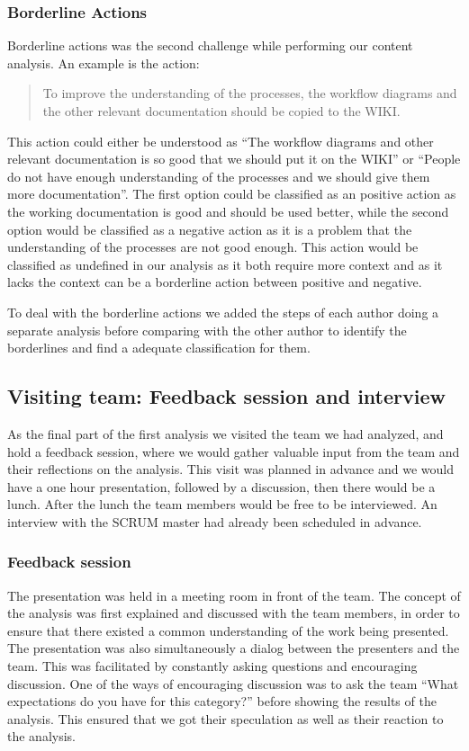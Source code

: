 \subsubsection{Borderline Actions}
Borderline actions was the second challenge while performing our content analysis. An example is the action: 
\begin{quote}
To improve the understanding of the processes, the workflow diagrams and the other relevant documentation should be copied to the WIKI.
\end{quote}
This action could either be understood as ``The workflow diagrams and other relevant documentation is so good that we should put it on the WIKI'' or ``People do not have enough understanding of the processes and we should give them more documentation''. The first option could be classified as an positive action as the working documentation is good and should be used better, while the second option would be classified as a negative action as it is a problem that the understanding of the processes are not good enough. This action would be classified as undefined in our analysis as it both require more context and as it lacks the context can be a borderline action between positive and negative. 

To deal with the borderline actions we added the steps of each author doing a separate analysis before comparing with the other author to identify the borderlines and find a adequate classification for them.


\subsection{Visiting team: Feedback session and interview}
As the final part of the first analysis we visited the team we had analyzed, and hold a feedback session, where we would gather valuable input from the team and their reflections on the analysis. This visit was planned in advance and we would have a one hour presentation, followed by a discussion, then there would be a lunch. After the lunch the team members would be free to be interviewed. An interview with the SCRUM master had already been scheduled in advance.

\subsubsection{Feedback session}
The presentation was held in a meeting room in front of the team. The concept of the analysis was first explained and discussed with the team members, in order to ensure that there existed a common understanding of the work being presented. The presentation was also simultaneously a dialog between the presenters and the team. This was facilitated by constantly asking questions and encouraging discussion. One of the ways of encouraging discussion was to ask the team ``What expectations do you have for this category?'' before showing the results of the analysis. This ensured that we got their speculation as well as their reaction to the analysis. 

